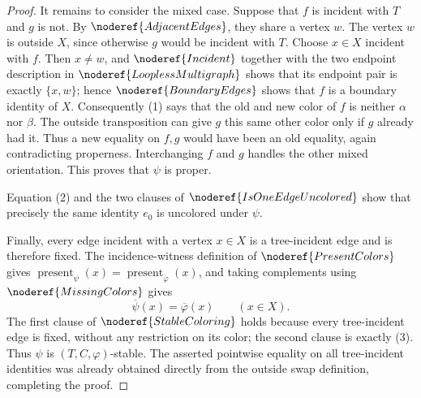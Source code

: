 \begin{proof}
It remains to consider the mixed case.  Suppose that \(f\) is incident
with \(T\) and \(g\) is not.  By \(\noderef{AdjacentEdges}\), they share
a vertex \(w\).  The vertex \(w\) is outside \(X\), since otherwise \(g\)
would be incident with \(T\).  Choose \(x\in X\) incident with \(f\).
Then \(x\ne w\), and \(\noderef{Incident}\) together with the two
endpoint description in \(\noderef{LooplessMultigraph}\) shows that its
endpoint pair is exactly \(\{x,w\}\); hence
\(\noderef{BoundaryEdges}\) shows that \(f\) is
a boundary identity of \(X\).  Consequently (1) says that the old and
new color of \(f\) is neither \(\alpha\) nor \(\beta\).  The outside
transposition can give \(g\) this same other color only if \(g\) already
had it.  Thus a new equality on \(f,g\) would have been an old equality,
again contradicting properness.  Interchanging \(f\) and \(g\) handles
the other mixed orientation.  This proves that \(\psi\) is proper.

Equation (2) and the two clauses of
\(\noderef{IsOneEdgeUncolored}\) show that precisely the same identity
\(e_0\) is uncolored under \(\psi\).

Finally, every edge incident with a vertex \(x\in X\) is a tree-incident
edge and is therefore fixed.  The incidence-witness definition of
\(\noderef{PresentColors}\) gives
\(\operatorname{present}_\psi(x)=\operatorname{present}_\varphi(x)\),
and taking complements using \(\noderef{MissingColors}\) gives
\[
                  \overline\psi(x)=\overline\varphi(x)
                  \qquad(x\in X).                            \tag{3}
\]
The first clause of \(\noderef{StableColoring}\) holds because every
tree-incident edge is fixed, without any restriction on its color; the
second clause is exactly (3).  Thus \(\psi\) is
\((T,C,\varphi)\)-stable.  The asserted pointwise equality on all
tree-incident identities was already obtained directly from the outside
swap definition, completing the proof.
\end{proof}
